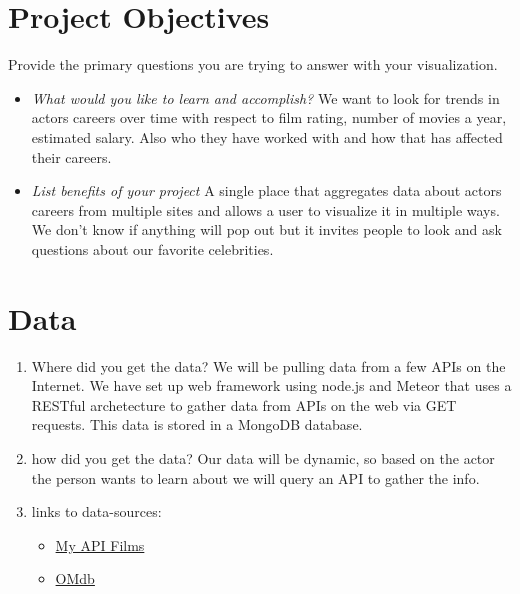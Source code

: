 \documentclass[12pt]{article}
\begin{document}
\section{Project Objectives}
Provide the primary questions you are trying to answer with your visualization. 
\begin{itemize}

    \item  {\it What would you like to learn and accomplish?}
    We want to look for trends in actors careers over time with respect to film rating, number of movies a year, estimated salary. Also who they have worked with and how that has affected their careers.

    \item  {\it List benefits of your project}
    A single place that aggregates data about actors careers from multiple sites and allows a user to visualize it in multiple ways. We don't know if anything will pop out but it invites people to look and ask questions about our favorite celebrities.  

\end{itemize}

\section{Data}
\begin{enumerate}
    \item Where did you get the data?
        We will be pulling data from a few APIs on the Internet. We have set up web framework using node.js and Meteor that uses a RESTful archetecture to gather data from APIs on the web via GET requests. This data is stored in a MongoDB database.
    
    \item how did you get the data?
        Our data will be dynamic, so based on the actor the person wants to learn about we will query an API to gather the info. 
    
    \item links to data-sources:
    \begin{itemize}
        \item \href{http://www.myapifilms.com/}{My API Films}
        \item \href{www.omdbapi.com}{OMdb}
    \end{itemize}
\end{enumerate}
\end{document}
